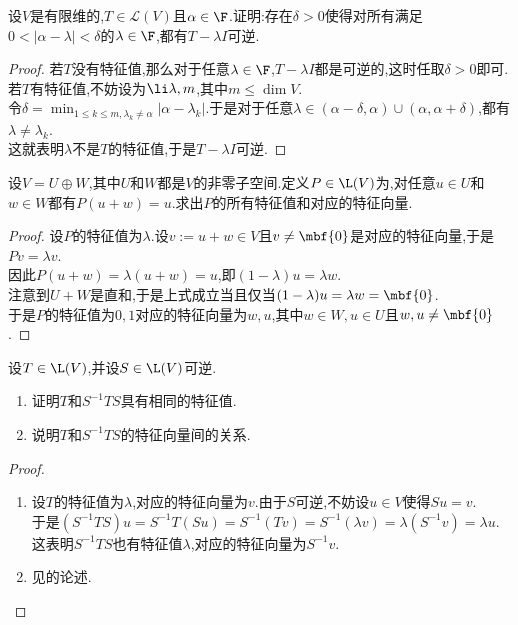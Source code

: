 \documentclass{ctexart}
\begin{document}
\begin{problem}[11.]
    设$V$是有限维的,$T\in\mathcal{L}(V)$且$\alpha\in\F$.证明:存在$\delta>0$使得对所有满足$0<\left|\alpha-\lambda\right|<\delta$的$\lambda\in\F$,都有$T-\lambda I$可逆.
\end{problem}
\begin{proof}
    若$T$没有特征值,那么对于任意$\lambda\in\F$,$T-\lambda I$都是可逆的,这时任取$\delta>0$即可.\\
    若$T$有特征值,不妨设为$\li\lambda,m$,其中$m\leqslant \dim V$.\\
    令$\displaystyle\delta=\min_{1\leqslant k\leqslant m,\lambda_k\neq\alpha}\left|\alpha-\lambda_k\right|$.于是对于任意$\lambda\in(\alpha-\delta,\alpha)\cup(\alpha,\alpha+\delta)$,都有$\lambda\neq\lambda_k$.\\
    这就表明$\lambda$不是$T$的特征值,于是$T-\lambda I$可逆.
\end{proof}
\begin{problem}[12.]
    设$V=U\oplus W$,其中$U$和$W$都是$V$的非零子空间.定义$P\in\L(V)$为,对任意$u\in U$和$w\in W$都有$P(u+w)=u$.求出$P$的所有特征值和对应的特征向量.
\end{problem}
\begin{proof}
    设$P$的特征值为$\lambda$.设$v:=u+w\in V$且$v\neq\mbf{0}$是对应的特征向量,于是$Pv=\lambda v$.\\
    因此$P(u+w)=\lambda(u+w)=u$,即$(1-\lambda)u=\lambda w$.\\
    注意到$U+W$是直和,于是上式成立当且仅当$(1-\lambda)u=\lambda w=\mbf{0}$.\\
    于是$P$的特征值为$0,1$对应的特征向量为$w,u$,其中$w\in W,u\in U$且$w,u\neq\mbf{0}$.
\end{proof}
\begin{problem}[13.]
    设$T\in\L(V)$,并设$S\in\L(V)$可逆.
    \begin{enumerate}[label=\tbf{(\arabic*)}]
        \item 证明$T$和$S^{-1}TS$具有相同的特征值.
        \item 说明$T$和$S^{-1}TS$的特征向量间的关系.
    \end{enumerate}
\end{problem}
\begin{proof}
    \begin{enumerate}[label=\tbf{(\arabic*)}]
        \item 设$T$的特征值为$\lambda$,对应的特征向量为$v$.由于$S$可逆,不妨设$u\in V$使得$Su=v$.\\
            于是$(S^{-1}TS)u=S^{-1}T(Su)=S^{-1}(Tv)=S^{-1}(\lambda v)=\lambda(S^{-1}v)=\lambda u$.\\
            这表明$S^{-1}TS$也有特征值$\lambda$,对应的特征向量为$S^{-1}v$.
        \item 见的论述.
    \end{enumerate}
\end{proof}
\end{document}
